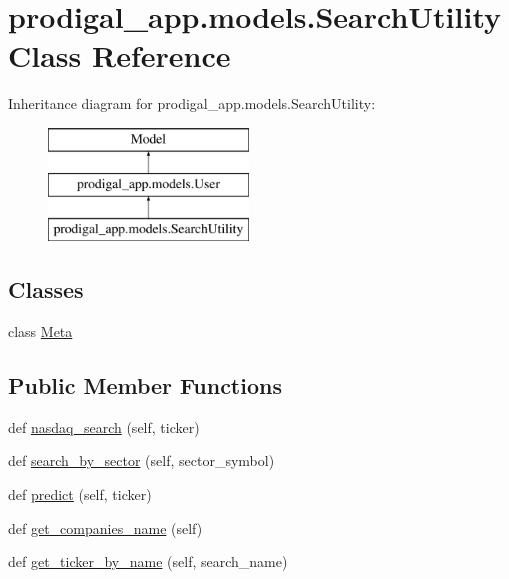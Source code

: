 \hypertarget{classprodigal__app_1_1models_1_1_search_utility}{}\section{prodigal\+\_\+app.\+models.\+Search\+Utility Class Reference}
\label{classprodigal__app_1_1models_1_1_search_utility}
Inheritance diagram for prodigal\+\_\+app.\+models.\+Search\+Utility\+:\begin{figure}[H]
\begin{center}
\leavevmode
\includegraphics[height=3.000000cm]{classprodigal__app_1_1models_1_1_search_utility}
\end{center}
\end{figure}
\subsection*{Classes}
\begin{DoxyCompactItemize}
\item 
class \mbox{\hyperlink{classprodigal__app_1_1models_1_1_search_utility_1_1_meta}{Meta}}
\end{DoxyCompactItemize}
\subsection*{Public Member Functions}
\begin{DoxyCompactItemize}
\item 
def \mbox{\hyperlink{classprodigal__app_1_1models_1_1_search_utility_a2675d62b9de091c0eb4d0e800ed3a083}{nasdaq\+\_\+search}} (self, ticker)
\item 
def \mbox{\hyperlink{classprodigal__app_1_1models_1_1_search_utility_af846eae6287a4470507a1646d9924167}{search\+\_\+by\+\_\+sector}} (self, sector\+\_\+symbol)
\item 
def \mbox{\hyperlink{classprodigal__app_1_1models_1_1_search_utility_a82375f3ad93900b3e7e9e6a336406de7}{predict}} (self, ticker)
\item 
def \mbox{\hyperlink{classprodigal__app_1_1models_1_1_search_utility_a3083578d1a1a282d1ec4f69dcca19254}{get\+\_\+companies\+\_\+name}} (self)
\item 
def \mbox{\hyperlink{classprodigal__app_1_1models_1_1_search_utility_ac3431632ae234dd98737631334b44938}{get\+\_\+ticker\+\_\+by\+\_\+name}} (self, search\+\_\+name)
\end{DoxyCompactItemize}
